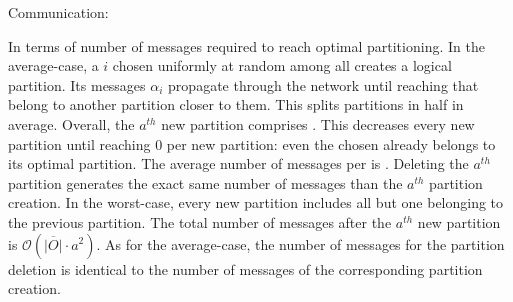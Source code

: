 \begin{asparadesc}
\item[Communication:]
  
In terms of number of messages required to reach optimal
partitioning. In the average-case, a \process $i$ chosen uniformly at
random among all \processes creates a logical partition. Its messages
$\alpha_i$ propagate through the network until reaching \processes
that belong to another partition closer to them. This splits
partitions in half in average. Overall, the $a^{th}$ new partition
comprises  \processes. This decreases every new partition
until reaching $0$ \processes per new partition: even the chosen
\process already belongs to its optimal partition. The average number
of messages per \process is
.  Deleting the
$a^{th}$ partition generates the exact same number of messages than
the $a^{th}$ partition creation.  In the
worst-case, every new partition includes all but one \process
belonging to the previous partition. The total number of messages
after the $a^{th}$ new partition is $\mathcal{O}(\overline{|O|}\cdot
a^2)$. As for the average-case, the number of messages for the
partition deletion is identical to the number of messages of the
corresponding partition creation.

\noindent {}

\end{asparadesc}

